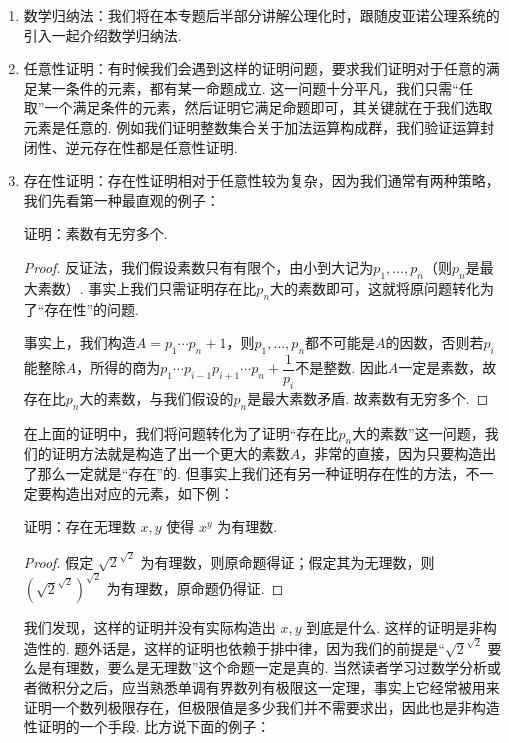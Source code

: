 \begin{enumerate}
    \item 数学归纳法：我们将在本专题后半部分讲解公理化时，跟随皮亚诺公理系统的引入一起介绍数学归纳法.

    \item 任意性证明：有时候我们会遇到这样的证明问题，要求我们证明对于任意的满足某一条件的元素，都有某一命题成立. 这一问题十分平凡，我们只需``任取''一个满足条件的元素，然后证明它满足命题即可，其关键就在于我们选取元素是任意的. 例如我们证明整数集合关于加法运算构成群，我们验证运算封闭性、逆元存在性都是任意性证明.

    \item 存在性证明：存在性证明相对于任意性较为复杂，因为我们通常有两种策略，我们先看第一种最直观的例子：
          \begin{example}{}{}
              证明：素数有无穷多个.
          \end{example}
          \begin{proof}
              反证法，我们假设素数只有有限个，由小到大记为$p_1,\ldots,p_n$（则$p_n$是最大素数）. 事实上我们只需证明存在比$p_n$大的素数即可，这就将原问题转化为了``存在性''的问题.

              事实上，我们构造$A=p_1\cdots p_n+1$，则$p_1,\ldots,p_n$都不可能是$A$的因数，否则若$p_i$能整除$A$，所得的商为$p_1\cdots p_{i-1}p_{i+1}\cdots p_n+\dfrac{1}{p_i}$不是整数. 因此$A$一定是素数，故存在比$p_n$大的素数，与我们假设的$p_n$是最大素数矛盾. 故素数有无穷多个.
          \end{proof}

          在上面的证明中，我们将问题转化为了证明``存在比$p_n$大的素数''这一问题，我们的证明方法就是构造了出一个更大的素数$A$，非常的直接，因为只要构造出了那么一定就是``存在''的. 但事实上我们还有另一种证明存在性的方法，不一定要构造出对应的元素，如下例：
          \begin{example*}{}{}
              证明：存在无理数 $x, y$ 使得 $x^y$ 为有理数.
          \end{example*}
          \begin{proof}
              假定 $\sqrt{2}^{\sqrt{2}}$ 为有理数，则原命题得证；假定其为无理数，则 $\left(\sqrt{2}^{\sqrt{2}}\right)^{\sqrt{2}}$ 为有理数，原命题仍得证.
          \end{proof}

          我们发现，这样的证明并没有实际构造出 $x, y$ 到底是什么. 这样的证明是非构造性的. 题外话是，这样的证明也依赖于排中律，因为我们的前提是``$\sqrt{2}^{\sqrt{2}}$ 要么是有理数，要么是无理数''这个命题一定是真的. 当然读者学习过数学分析或者微积分之后，应当熟悉单调有界数列有极限这一定理，事实上它经常被用来证明一个数列极限存在，但极限值是多少我们并不需要求出，因此也是非构造性证明的一个手段. 比方说下面的例子：


\end{enumerate}
